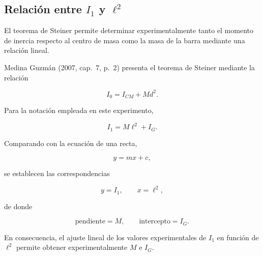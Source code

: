 \documentclass[11pt,a4paper]{article}
\newenvironment{subsectionbody}
{%
    \begin{list}{}{%
        \setlength{\leftmargin}{0.6cm}%
        \setlength{\rightmargin}{0cm}%
        \setlength{\topsep}{0pt}%
        \setlength{\partopsep}{0pt}%
        \setlength{\parsep}{0pt}%
        \setlength{\itemsep}{0pt}%
    }%
    \item\relax
}
{%
    \end{list}
}
\begin{document}
\subsection{Relación entre \texorpdfstring{$I_1$}{I1} y
\texorpdfstring{$\ell^2$}{l2}}

\begin{subsectionbody}

El teorema de Steiner permite determinar experimentalmente tanto el
momento de inercia respecto al centro de masa como la masa de la barra
mediante una relación lineal.

Medina Guzmán (2007, cap.~7, p.~2) presenta el teorema de Steiner
mediante la relación

\[
I_0=I_{CM}+Md^2.
\]

Para la notación empleada en este experimento,

\[
I_1=M\ell^2+I_G.
\]

Comparando con la ecuación de una recta,

\[
y=mx+c,
\]

se establecen las correspondencias

\[
y=I_1,
\qquad
x=\ell^2,
\]

de donde

\[
\text{pendiente}=M,
\qquad
\text{intercepto}=I_G.
\]

En consecuencia, el ajuste lineal de los valores experimentales de
$I_1$ en función de $\ell^2$ permite obtener experimentalmente $M$ e
$I_G$.

\end{subsectionbody}
\end{document}

